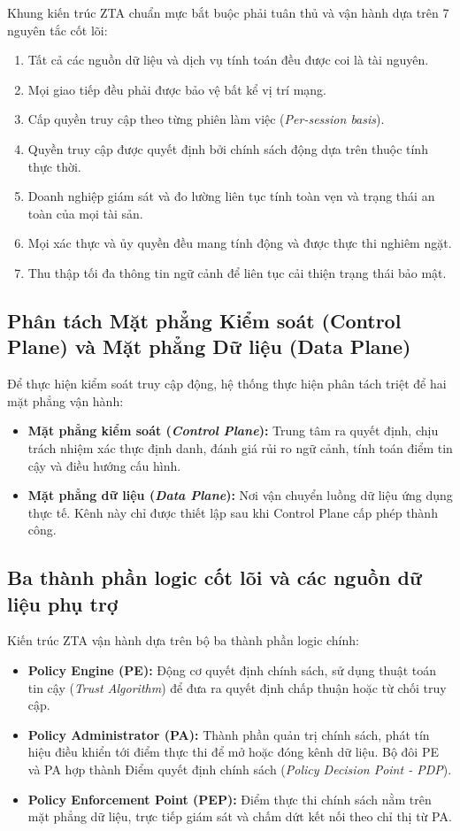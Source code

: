 Khung kiến trúc ZTA chuẩn mực bắt buộc phải tuân thủ và vận hành dựa trên 7 nguyên tắc cốt lõi:
\begin{enumerate}
    \item Tất cả các nguồn dữ liệu và dịch vụ tính toán đều được coi là tài nguyên.
    \item Mọi giao tiếp đều phải được bảo vệ bất kể vị trí mạng.
    \item Cấp quyền truy cập theo từng phiên làm việc (\textit{Per-session basis}).
    \item Quyền truy cập được quyết định bởi chính sách động dựa trên thuộc tính thực thời.
    \item Doanh nghiệp giám sát và đo lường liên tục tính toàn vẹn và trạng thái an toàn của mọi tài sản.
    \item Mọi xác thực và ủy quyền đều mang tính động và được thực thi nghiêm ngặt.
    \item Thu thập tối đa thông tin ngữ cảnh để liên tục cải thiện trạng thái bảo mật.
\end{enumerate}

\subsection{Phân tách Mặt phẳng Kiểm soát (Control Plane) và Mặt phẳng Dữ liệu (Data Plane)}
\label{subsec:2_1_3}

Để thực hiện kiểm soát truy cập động, hệ thống thực hiện phân tách triệt để hai mặt phẳng vận hành:
\begin{itemize}
    \item \textbf{Mặt phẳng kiểm soát (\textit{Control Plane}):} Trung tâm ra quyết định, chịu trách nhiệm xác thực định danh, đánh giá rủi ro ngữ cảnh, tính toán điểm tin cậy và điều hướng cấu hình.
    \item \textbf{Mặt phẳng dữ liệu (\textit{Data Plane}):} Nơi vận chuyển luồng dữ liệu ứng dụng thực tế. Kênh này chỉ được thiết lập sau khi Control Plane cấp phép thành công.
\end{itemize}

\subsection{Ba thành phần logic cốt lõi và các nguồn dữ liệu phụ trợ}
\label{subsec:2_1_4}

Kiến trúc ZTA vận hành dựa trên bộ ba thành phần logic chính:
\begin{itemize}
    \item \textbf{Policy Engine (PE):} Động cơ quyết định chính sách, sử dụng thuật toán tin cậy (\textit{Trust Algorithm}) để đưa ra quyết định chấp thuận hoặc từ chối truy cập.
    \item \textbf{Policy Administrator (PA):} Thành phần quản trị chính sách, phát tín hiệu điều khiển tới điểm thực thi để mở hoặc đóng kênh dữ liệu. Bộ đôi PE và PA hợp thành Điểm quyết định chính sách (\textit{Policy Decision Point - PDP}).
    \item \textbf{Policy Enforcement Point (PEP):} Điểm thực thi chính sách nằm trên mặt phẳng dữ liệu, trực tiếp giám sát và chấm dứt kết nối theo chỉ thị từ PA.
\end{itemize}

